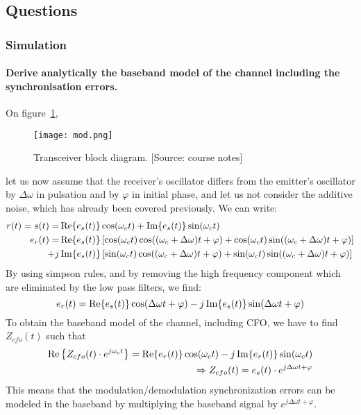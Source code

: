 \subsection{Questions}
\subsubsection{Simulation}

\paragraph{Derive analytically the baseband model of the channel including the synchronisation errors.}
On figure~\ref{fig:mod},
\begin{figure}
  \centering
  \texttt{[image: mod.png]}
  \caption[Transceiver block diagram.]{Transceiver block diagram. [Source: course notes]\label{fig:mod}}
\end{figure}
let us now assume that the receiver's oscillator differs from the emitter's oscillator by $\Delta \omega$ in pulsation and by $\varphi$ in initial phase, and let us not consider the additive noise, which has already been covered previously.
We can write:
\begin{align*}
  r(t) = s(t) = &\operatorname{Re} \{e_s(t)\} \cos(\omega_c t) + \operatorname{Im} \{e_s(t)\} \sin ( \omega_c t)\\
  e_r(t) = &\operatorname{Re} \{e_s(t)\} \left [ \cos(\omega_c t)\cos((\omega_c + \Delta\omega) t + \varphi) + \cos(\omega_c t)\sin((\omega_c + \Delta\omega) t + \varphi) \right ] \\
  +j &\operatorname{Im} \{e_s(t)\} \left [ \sin(\omega_c t)\cos((\omega_c + \Delta\omega) t + \varphi) + \sin(\omega_c t)\sin((\omega_c + \Delta\omega) t + \varphi) \right ]
\end{align*}
By using simpson rules, and by removing the high frequency component which are eliminated by the low pass filters, we find:
\[
e_r(t) = \operatorname{Re}\{e_s(t)\} \cos(\Delta \omega t + \varphi) - j\operatorname{Im}\{e_s(t)\} \sin(\Delta \omega t + \varphi)
\]
To obtain the baseband model of the channel, including CFO, we have to find $Z_{cfo}(t)$ such that
\begin{align*}
  \operatorname{Re} \left \{Z_{cfo}(t)\cdot e^{j\omega_c t} \right \} = \operatorname{Re}\{e_r(t)\} \cos(\omega_c t) - j \operatorname{Im} \{ e_r(t) \} \sin(\omega_c t)\\
  \Rightarrow Z_{cfo}(t) = e_s(t)\cdot e^{j\Delta \omega t + \varphi}
\end{align*}
This means that the modulation/demodulation synchronization errors can be modeled in the baseband by multiplying the baseband signal by $e^{j\Delta \omega t + \varphi}$.

